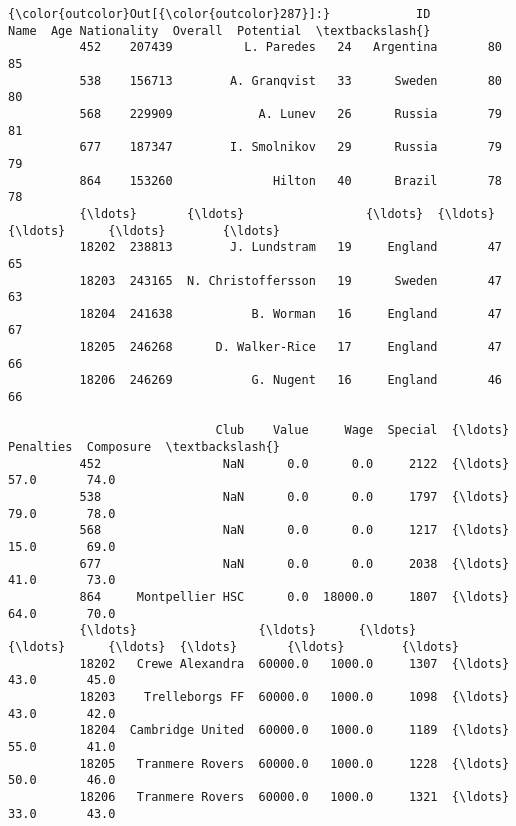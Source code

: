 \documentclass[11pt]{article}
\begin{document}
\begin{Verbatim}[commandchars=\\\{\}]
{\color{outcolor}Out[{\color{outcolor}287}]:}            ID                Name  Age Nationality  Overall  Potential  \textbackslash{}
          452    207439          L. Paredes   24   Argentina       80         85   
          538    156713        A. Granqvist   33      Sweden       80         80   
          568    229909            A. Lunev   26      Russia       79         81   
          677    187347        I. Smolnikov   29      Russia       79         79   
          864    153260              Hilton   40      Brazil       78         78   
          {\ldots}       {\ldots}                 {\ldots}  {\ldots}         {\ldots}      {\ldots}        {\ldots}   
          18202  238813        J. Lundstram   19     England       47         65   
          18203  243165  N. Christoffersson   19      Sweden       47         63   
          18204  241638           B. Worman   16     England       47         67   
          18205  246268      D. Walker-Rice   17     England       47         66   
          18206  246269           G. Nugent   16     England       46         66   
          
                             Club    Value     Wage  Special  {\ldots} Penalties  Composure  \textbackslash{}
          452                 NaN      0.0      0.0     2122  {\ldots}      57.0       74.0   
          538                 NaN      0.0      0.0     1797  {\ldots}      79.0       78.0   
          568                 NaN      0.0      0.0     1217  {\ldots}      15.0       69.0   
          677                 NaN      0.0      0.0     2038  {\ldots}      41.0       73.0   
          864     Montpellier HSC      0.0  18000.0     1807  {\ldots}      64.0       70.0   
          {\ldots}                 {\ldots}      {\ldots}      {\ldots}      {\ldots}  {\ldots}       {\ldots}        {\ldots}   
          18202   Crewe Alexandra  60000.0   1000.0     1307  {\ldots}      43.0       45.0   
          18203    Trelleborgs FF  60000.0   1000.0     1098  {\ldots}      43.0       42.0   
          18204  Cambridge United  60000.0   1000.0     1189  {\ldots}      55.0       41.0   
          18205   Tranmere Rovers  60000.0   1000.0     1228  {\ldots}      50.0       46.0   
          18206   Tranmere Rovers  60000.0   1000.0     1321  {\ldots}      33.0       43.0   
          

\end{Verbatim}
\end{document}

